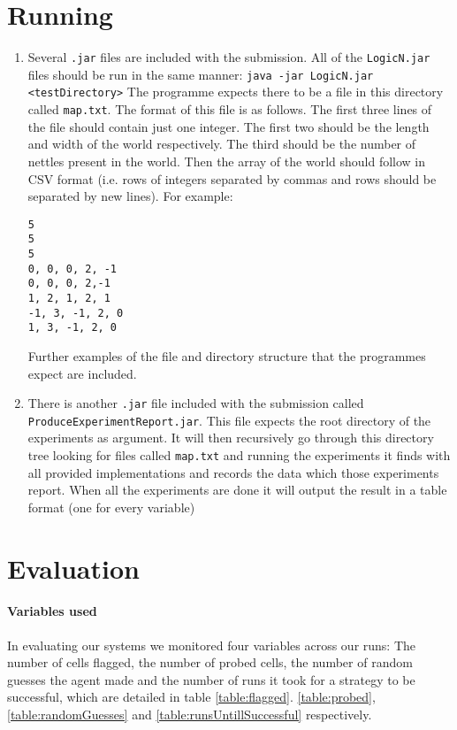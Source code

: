 \documentclass[british]{article}
\newcommand{\code}[1]{\texttt{#1}}
\begin{document}
\section{Running}
\label{running}
\begin{enumerate}
\item  Several \code{.jar} files are included with the submission. All of the \code{LogicN.jar} files should be run in the same manner: \code{java -jar LogicN.jar <testDirectory>} The programme expects there to be a file in this directory called \code{map.txt}. The format of this file is as follows. The first three lines of the file should contain just one integer. The first two should be the length and width of the world respectively. The third should be the number of nettles present in the world. Then the array of the world should follow in CSV format (i.e. rows of integers separated by commas and rows should be separated by new lines). For example: \begin{lstlisting}
5
5
5
0, 0, 0, 2, -1
0, 0, 0, 2,-1
1, 2, 1, 2, 1
-1, 3, -1, 2, 0
1, 3, -1, 2, 0
\end{lstlisting} Further examples of the file and directory structure that the programmes expect are included.
\item There is another \code{.jar} file included with the submission called \code{ProduceExperimentReport.jar}. This file expects  the root directory of the experiments as argument. It will then recursively go through this directory tree looking for files called \code{map.txt}  and running the experiments it finds with all provided implementations and records the data which those experiments report. When all the experiments are done it will output the result in a table format (one for every variable)  
\end{enumerate}
\section{Evaluation}
\label{evals}
\paragraph{Variables used} In evaluating our systems we monitored four variables across our runs: The number of cells flagged, the number of probed cells, the number of random guesses the agent made and the number of runs it took for a strategy to be successful, which are detailed in table \ref{table:flagged}. \ref{table:probed}, \ref{table:randomGuesses} and \ref{table:runsUntillSuccessful} respectively.
\end{document}
